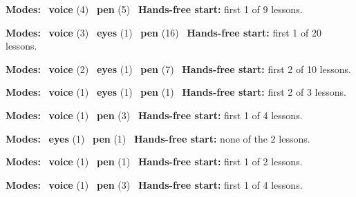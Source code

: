 \expandafter\def\csname hlchaptermodality6\endcsname{%
  {\small\noindent
    \textbf{Modes:} \hlvoicesign{}~\textbf{voice} (4) \quad \hlpensign{}~\textbf{pen} (5)\quad
    \hlvoicesign{}~\textbf{Hands-free start:} first 1 of 9 lessons.%
    \par}\medskip
}

\expandafter\def\csname hlchaptermodality7\endcsname{%
  {\small\noindent
    \textbf{Modes:} \hlvoicesign{}~\textbf{voice} (3) \quad \hlsightsign{}~\textbf{eyes} (1) \quad \hlpensign{}~\textbf{pen} (16)\quad
    \hlvoicesign{}~\textbf{Hands-free start:} first 1 of 20 lessons.%
    \par}\medskip
}

\expandafter\def\csname hlchaptermodality8\endcsname{%
  {\small\noindent
    \textbf{Modes:} \hlvoicesign{}~\textbf{voice} (2) \quad \hlsightsign{}~\textbf{eyes} (1) \quad \hlpensign{}~\textbf{pen} (7)\quad
    \hlvoicesign{}~\textbf{Hands-free start:} first 2 of 10 lessons.%
    \par}\medskip
}

\expandafter\def\csname hlchaptermodality9\endcsname{%
  {\small\noindent
    \textbf{Modes:} \hlvoicesign{}~\textbf{voice} (1) \quad \hlsightsign{}~\textbf{eyes} (1) \quad \hlpensign{}~\textbf{pen} (1)\quad
    \hlvoicesign{}~\textbf{Hands-free start:} first 2 of 3 lessons.%
    \par}\medskip
}

\expandafter\def\csname hlchaptermodality10\endcsname{%
  {\small\noindent
    \textbf{Modes:} \hlvoicesign{}~\textbf{voice} (1) \quad \hlpensign{}~\textbf{pen} (3)\quad
    \hlvoicesign{}~\textbf{Hands-free start:} first 1 of 4 lessons.%
    \par}\medskip
}

\expandafter\def\csname hlchaptermodality11\endcsname{%
  {\small\noindent
    \textbf{Modes:} \hlsightsign{}~\textbf{eyes} (1) \quad \hlpensign{}~\textbf{pen} (1)\quad
    \hlvoicesign{}~\textbf{Hands-free start:} none of the 2 lessons.%
    \par}\medskip
}

\expandafter\def\csname hlchaptermodality12\endcsname{%
  {\small\noindent
    \textbf{Modes:} \hlvoicesign{}~\textbf{voice} (1) \quad \hlpensign{}~\textbf{pen} (1)\quad
    \hlvoicesign{}~\textbf{Hands-free start:} first 1 of 2 lessons.%
    \par}\medskip
}

\expandafter\def\csname hlchaptermodality13\endcsname{%
  {\small\noindent
    \textbf{Modes:} \hlvoicesign{}~\textbf{voice} (1) \quad \hlpensign{}~\textbf{pen} (3)\quad
    \hlvoicesign{}~\textbf{Hands-free start:} first 1 of 4 lessons.%
    \par}\medskip
}

